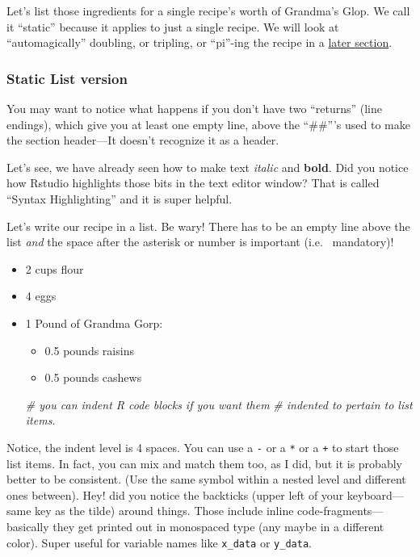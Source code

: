 \documentclass[
]{article}
\newenvironment{Shaded}{\begin{snugshade}}{\end{snugshade}}
\newcommand{\CommentTok}[1]{\textcolor[rgb]{0.56,0.35,0.01}{\textit{#1}}}
\providecommand{\tightlist}{%
  \setlength{\itemsep}{0pt}\setlength{\parskip}{0pt}}
\begin{document}
Let's list those ingredients for a single recipe's worth of Grandma's
Glop. We call it ``static'' because it applies to just a single recipe.
We will look at ``automagically'' doubling, or tripling, or ``pi''-ing
the recipe in a \protect\hyperlink{calc-quants}{later section}.

\hypertarget{static-recipe-list}{%
\subsubsection{Static List version}\label{static-recipe-list}}

You may want to notice what happens if you don't have two ``returns''
(line endings), which give you at least one empty line, above the
``\#\#'''s used to make the section header---It doesn't recognize it as
a header.

Let's see, we have already seen how to make text \emph{italic} and
\textbf{bold}. Did you notice how Rstudio highlights those bits in the
text editor window? That is called ``Syntax Highlighting'' and it is
super helpful.

Let's write our recipe in a list. Be wary! There has to be an empty line
above the list \emph{and} the space after the asterisk or number is
important (i.e.~ mandatory)!

\begin{itemize}
\tightlist
\item
  2 cups flour
\item
  4 eggs
\item
  1 Pound of Grandma Gorp:

  \begin{itemize}
  \tightlist
  \item
    0.5 pounds raisins
  \item
    0.5 pounds cashews
  \end{itemize}

\begin{Shaded}
\begin{Highlighting}[]
\CommentTok{\# you can indent R code blocks if you want them }
\CommentTok{\# indented to pertain to list items.}
\end{Highlighting}
\end{Shaded}
\end{itemize}

Notice, the indent level is 4 spaces. You can use a \texttt{-} or a
\texttt{*} or a \texttt{+} to start those list items. In fact, you can
mix and match them too, as I did, but it is probably better to be
consistent. (Use the same symbol within a nested level and different
ones between). Hey! did you notice the backticks (upper left of your
keyboard--- same key as the tilde) around things. Those include inline
code-fragments---basically they get printed out in monospaced type (any
maybe in a different color). Super useful for variable names like
\texttt{x\_data} or \texttt{y\_data}.
\end{document}

